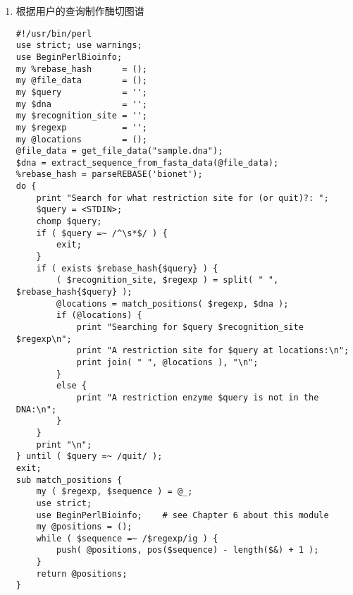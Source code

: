\documentclass{TIJMUjiaoanSY}
\begin{document}
\begin{enumerate}
\begin{enumerate}
      \item 根据用户的查询制作酶切图谱
\begin{verbatim}
#!/usr/bin/perl
use strict; use warnings;
use BeginPerlBioinfo;
my %rebase_hash      = ();
my @file_data        = ();
my $query            = '';
my $dna              = '';
my $recognition_site = '';
my $regexp           = '';
my @locations        = ();
@file_data = get_file_data("sample.dna");
$dna = extract_sequence_from_fasta_data(@file_data);
%rebase_hash = parseREBASE('bionet');
do {
    print "Search for what restriction site for (or quit)?: ";
    $query = <STDIN>;
    chomp $query;
    if ( $query =~ /^\s*$/ ) {
        exit;
    }
    if ( exists $rebase_hash{$query} ) {
        ( $recognition_site, $regexp ) = split( " ", $rebase_hash{$query} );
        @locations = match_positions( $regexp, $dna );
        if (@locations) {
            print "Searching for $query $recognition_site $regexp\n";
            print "A restriction site for $query at locations:\n";
            print join( " ", @locations ), "\n";
        }
        else {
            print "A restriction enzyme $query is not in the DNA:\n";
        }
    }
    print "\n";
} until ( $query =~ /quit/ );
exit;
sub match_positions {
    my ( $regexp, $sequence ) = @_;
    use strict;
    use BeginPerlBioinfo;    # see Chapter 6 about this module
    my @positions = ();
    while ( $sequence =~ /$regexp/ig ) {
        push( @positions, pos($sequence) - length($&) + 1 );
    }
    return @positions;
}
\end{verbatim}
    \end{enumerate}
\end{enumerate}

\otherTail

\end{document}
